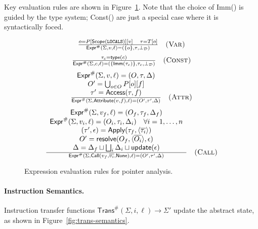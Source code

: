 Key evaluation rules are shown in Figure~\ref{fig:expr-semantics}. Note that the choice of Imm() is guided by the type system; Const() are just a special case where it is syntactically foced. 

\begin{figure}[t]
\centering
\[
\begin{array}{c}
\frac{
  o = P[\mathsf{Scope}(\mathtt{LOCALS})][v]
  \quad \tau = T[o]
}{
  \mathsf{Expr}^\#(\Sigma, v, \ell) = (\{o\}, \tau, \bot_\mathcal{D})
} \quad \textsc{(Var)}
\\[2ex]
\frac{
  \tau_c = \mathsf{type}(c)
}{
  \mathsf{Expr}^\#(\Sigma, c, \ell) = (\{\mathsf{Imm}(\tau_c)\}, \tau_c, \bot_\mathcal{D})
} \quad \textsc{(Const)}
\\[2ex]
\frac{
  \begin{array}{c}
    \mathsf{Expr}^\#(\Sigma, v, \ell) = (O,\tau,\Delta) \\
    O' = \bigcup_{o\in O} P[o][f] \\
    \tau' = \mathsf{Access}(\tau,f)
  \end{array}
}{
  \mathsf{Expr}^\#(\Sigma, \mathsf{Attribute}(v,f), \ell)
    = (O',\tau',\Delta)
} \quad \textsc{(Attr)}
\\[2ex]
\frac{
  \begin{array}{c}
    \mathsf{Expr}^\#(\Sigma,v_f,\ell) = (O_f,\tau_f,\Delta_f) \\
    \mathsf{Expr}^\#(\Sigma,v_i,\ell) = (O_i,\tau_i,\Delta_i)\quad\forall i=1,\dots,n \\
    (\tau',\epsilon) = \mathsf{Apply}(\tau_f,\langle\overline{\tau_i}\rangle) \\
    O' = \mathsf{resolve}(O_f,\langle\overline{O_i}\rangle,\epsilon) \\
    \Delta = \Delta_f \sqcup \bigsqcup_i \Delta_i \sqcup \mathsf{update}(\epsilon)
  \end{array}
}{
  \mathsf{Expr}^\#(\Sigma,\mathsf{Call}(v_f,\overline{v_i},\mathsf{None}),\ell)
    = (O',\tau',\Delta)
} \quad \textsc{(Call)}
\end{array}
\]
\caption{Expression evaluation rules for pointer analysis.}
\label{fig:expr-semantics}
\end{figure}

\paragraph{Instruction Semantics.}
Instruction transfer functions $\mathsf{Trans}^\#(\Sigma,i,\ell) \to \Sigma'$ update the abstract state, as shown in Figure~\ref{fig:trans-semantics}.

